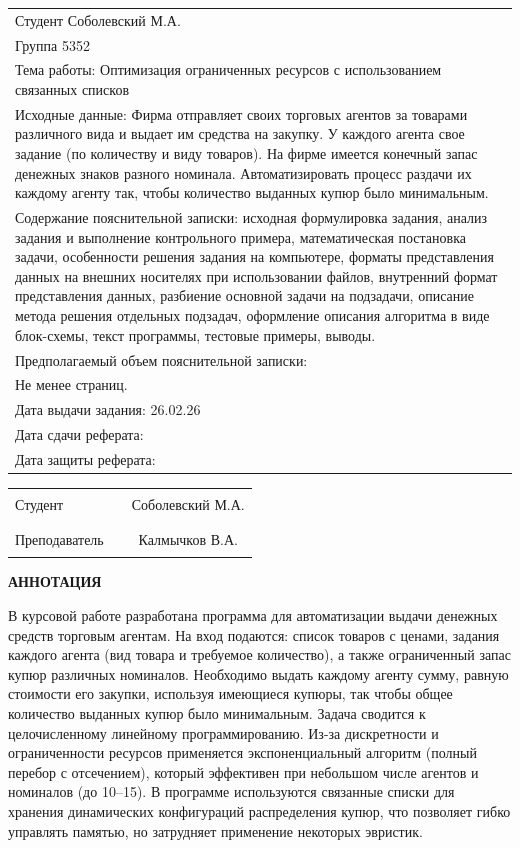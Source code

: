 \documentclass[12pt]{extarticle}
\begin{document}
\begin{tabularx}{\textwidth}{ X }
  Студент Соболевский М.А.\\
  Группа 5352 \\
  Тема работы: Оптимизация ограниченных ресурсов с использованием связанных списков \\
  Исходные данные: Фирма отправляет своих торговых агентов за товарами различного вида и выдает им средства на закупку. У каждого агента свое задание (по количеству и виду товаров). На фирме имеется конечный запас денежных знаков разного номинала. Автоматизировать процесс раздачи их каждому агенту так, чтобы количество выданных купюр было минимальным. \\
  Содержание пояснительной записки: исходная формулировка задания, анализ задания и выполнение контрольного примера, математическая постановка задачи, особенности решения задания на компьютере, форматы представления данных на внешних носителях при использовании файлов, внутренний формат представления данных, разбиение основной задачи на подзадачи, описание метода решения отдельных подзадач, оформление описания алгоритма в виде блок-схемы, текст программы, тестовые примеры, выводы. \\
  Предполагаемый объем пояснительной записки: \\
  Не менее \pageref{LastPage} страниц. \\
  Дата выдачи задания: 26.02.26 \\
  Дата сдачи реферата: \\
  Дата защиты реферата: \\
\end{tabularx}

\vfill

\begin{tabularx}{\textwidth}{ l X c }
  Студент	& \rule{8cm}{0.2mm} &	Соболевский М.А. \\
  Преподаватель	& \rule{8cm}{0.2mm} &	Калмычков В.А.
\end{tabularx}

\pagebreak

\centering \textbf{АННОТАЦИЯ}

\justifying
В курсовой работе разработана программа для автоматизации выдачи денежных средств торговым агентам. На вход подаются: список товаров с ценами, задания каждого агента (вид товара и требуемое количество), а также ограниченный запас купюр различных номиналов. Необходимо выдать каждому агенту сумму, равную стоимости его закупки, используя имеющиеся купюры, так чтобы общее количество выданных купюр было минимальным. Задача сводится к целочисленному линейному программированию. Из-за дискретности и ограниченности ресурсов применяется экспоненциальный алгоритм (полный перебор с отсечением), который эффективен при небольшом числе агентов и номиналов (до 10–15). В программе используются связанные списки для хранения динамических конфигураций распределения купюр, что позволяет гибко управлять памятью, но затрудняет применение некоторых эвристик.
\end{document}
